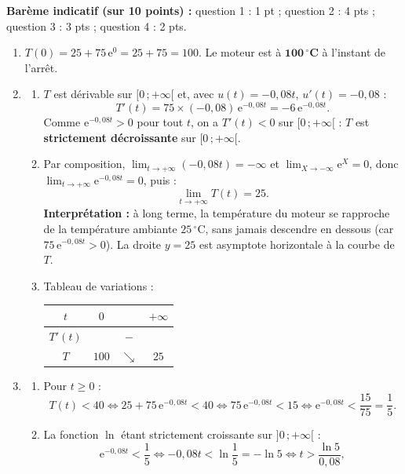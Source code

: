 \documentclass[11pt]{article}
\begin{document}
\begin{corrige}
\textbf{Barème indicatif (sur 10 points) :} question 1 : 1 pt ; question 2 : 4 pts ; question 3 : 3 pts ; question 4 : 2 pts.

\begin{enumerate}
\item $T(0) = 25 + 75\,\mathrm{e}^{0} = 25 + 75 = 100$. Le moteur est à $\mathbf{100\,^{\circ}C}$ à l'instant de l'arrêt.
\item \begin{enumerate}
\item $T$ est dérivable sur $[0\,;+\infty[$ et, avec $u(t) = -0{,}08t$, $u'(t) = -0{,}08$ :
\[ T'(t) = 75 \times (-0{,}08)\,\mathrm{e}^{-0{,}08t} = -6\,\mathrm{e}^{-0{,}08t}. \]
Comme $\mathrm{e}^{-0{,}08t} > 0$ pour tout $t$, on a $T'(t) < 0$ sur $[0\,;+\infty[$ : $T$ est \textbf{strictement décroissante} sur $[0\,;+\infty[$.
\item Par composition, $\displaystyle\lim_{t \to +\infty}(-0{,}08t) = -\infty$ et $\displaystyle\lim_{X \to -\infty} \mathrm{e}^{X} = 0$, donc $\displaystyle\lim_{t \to +\infty} \mathrm{e}^{-0{,}08t} = 0$, puis :
\[ \lim_{t \to +\infty} T(t) = 25. \]
\textbf{Interprétation :} à long terme, la température du moteur se rapproche de la température ambiante $25\,^{\circ}\mathrm{C}$, sans jamais descendre en dessous (car $75\,\mathrm{e}^{-0{,}08t} > 0$). La droite $y = 25$ est asymptote horizontale à la courbe de $T$.
\item Tableau de variations :
\begin{center}
\begin{tabular}{|c|ccc|}
\hline
$t$ & $0$ & & $+\infty$ \\
\hline
$T'(t)$ & & $-$ & \\
\hline
$T$ & $100$ & $\searrow$ & $25$ \\
\hline
\end{tabular}
\end{center}
\end{enumerate}
\item \begin{enumerate}
\item Pour $t \geq 0$ :
\[ T(t) < 40 \iff 25 + 75\,\mathrm{e}^{-0{,}08t} < 40 \iff 75\,\mathrm{e}^{-0{,}08t} < 15 \iff \mathrm{e}^{-0{,}08t} < \dfrac{15}{75} = \dfrac{1}{5}. \]
\item La fonction $\ln$ étant strictement croissante sur $]0\,;+\infty[$ :
\[ \mathrm{e}^{-0{,}08t} < \dfrac{1}{5} \iff -0{,}08t < \ln\dfrac{1}{5} = -\ln 5 \iff t > \dfrac{\ln 5}{0{,}08}, \]

\end{enumerate}
\end{enumerate}
\end{corrige}
\end{document}
